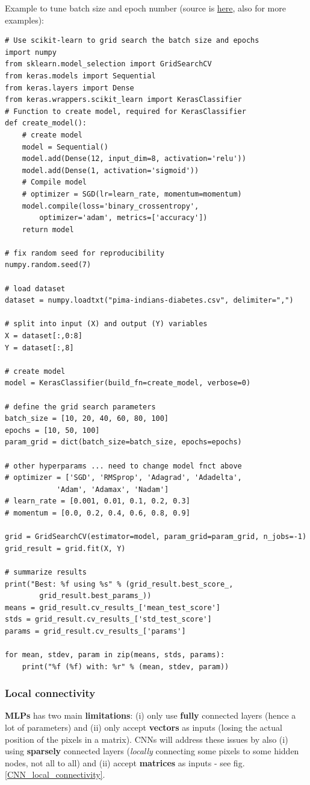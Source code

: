 \documentclass[11pt]{article}
\begin{document}
Example to tune batch size and epoch number (source is \href{https://machinelearningmastery.com/grid-search-hyperparameters-deep-learning-models-python-keras/}{here}, also for more examples):
\begin{lstlisting}
# Use scikit-learn to grid search the batch size and epochs
import numpy
from sklearn.model_selection import GridSearchCV
from keras.models import Sequential
from keras.layers import Dense
from keras.wrappers.scikit_learn import KerasClassifier
# Function to create model, required for KerasClassifier
def create_model():
	# create model
	model = Sequential()
	model.add(Dense(12, input_dim=8, activation='relu'))
	model.add(Dense(1, activation='sigmoid'))
	# Compile model
	# optimizer = SGD(lr=learn_rate, momentum=momentum)
	model.compile(loss='binary_crossentropy', 
		optimizer='adam', metrics=['accuracy'])
	return model

# fix random seed for reproducibility
numpy.random.seed(7)

# load dataset
dataset = numpy.loadtxt("pima-indians-diabetes.csv", delimiter=",")

# split into input (X) and output (Y) variables
X = dataset[:,0:8]
Y = dataset[:,8]

# create model
model = KerasClassifier(build_fn=create_model, verbose=0)

# define the grid search parameters
batch_size = [10, 20, 40, 60, 80, 100]
epochs = [10, 50, 100]
param_grid = dict(batch_size=batch_size, epochs=epochs)

# other hyperparams ... need to change model fnct above
# optimizer = ['SGD', 'RMSprop', 'Adagrad', 'Adadelta', 
			'Adam', 'Adamax', 'Nadam']
# learn_rate = [0.001, 0.01, 0.1, 0.2, 0.3]
# momentum = [0.0, 0.2, 0.4, 0.6, 0.8, 0.9]

grid = GridSearchCV(estimator=model, param_grid=param_grid, n_jobs=-1)
grid_result = grid.fit(X, Y)

# summarize results
print("Best: %f using %s" % (grid_result.best_score_, 			
		grid_result.best_params_))
means = grid_result.cv_results_['mean_test_score']
stds = grid_result.cv_results_['std_test_score']
params = grid_result.cv_results_['params']

for mean, stdev, param in zip(means, stds, params):
	print("%f (%f) with: %r" % (mean, stdev, param))
\end{lstlisting}

\subsubsection*{Local connectivity}
\textbf{MLPs} has two main \textbf{limitations}: (i) only use \textbf{fully} connected layers (hence a lot of parameters) and (ii) only accept \textbf{vectors} as inputs (losing the actual position of the pixels in a matrix). CNNs will address these issues by also (i) using \textbf{sparsely} connected layers (\textit{locally} connecting some pixels to some hidden nodes, not all to all) and (ii) accept \textbf{matrices} as inputs - see fig. \ref{CNN_local_connectivity}.
\end{document}
